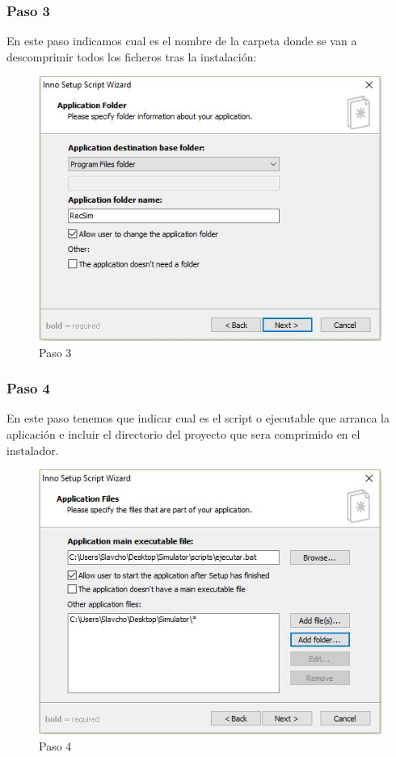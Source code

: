 \subsubsection{Paso 3}

En este paso indicamos cual es el nombre de la carpeta donde se van a descomprimir todos los ficheros tras la instalación:

\begin{figure}[H]
	\centering\includegraphics[scale=0.5]{imagenes/implementacion/3.jpg}
	\caption{Paso 3}
	\label{instaladorPaso3}
\end{figure}

\subsubsection{Paso 4}

En este paso tenemos que indicar cual es el script o ejecutable que arranca la aplicación e incluir el directorio del proyecto que sera comprimido en el instalador.

\begin{figure}[H]
	\centering\includegraphics[scale=0.5]{imagenes/implementacion/4.jpg}
	\caption{Paso 4}
	\label{instaladorPaso4}
\end{figure}

